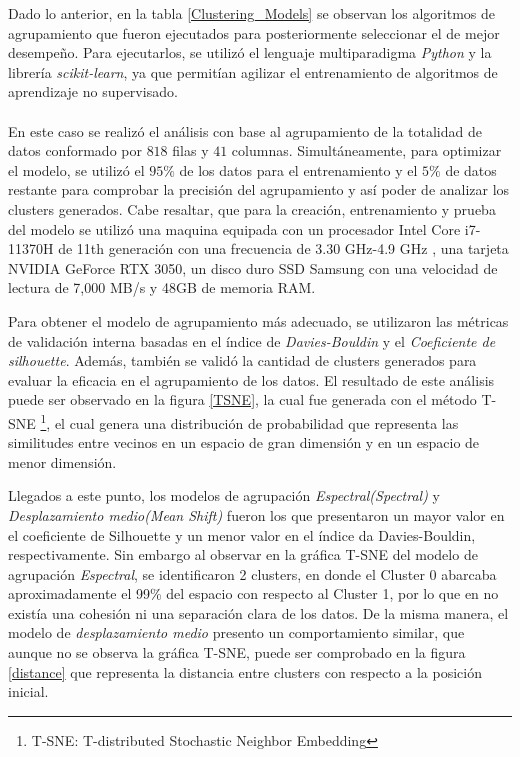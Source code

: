 Dado lo anterior, en la tabla \ref{Clustering_Models} se observan los algoritmos de agrupamiento que fueron ejecutados para posteriormente seleccionar el de mejor desempeño. Para ejecutarlos, se utilizó el lenguaje multiparadigma \textit{Python} y la librería \textit{scikit-learn}, ya que permitían agilizar el entrenamiento de algoritmos de aprendizaje no supervisado.
\\\\
En este caso se realizó el análisis con base al agrupamiento de la totalidad de datos conformado por $818$ filas y $41$ columnas. Simultáneamente, para optimizar el modelo, se utilizó el $95\%$ de los datos para el entrenamiento y el $5\%$ de datos restante para comprobar la precisión del agrupamiento y así poder de analizar los clusters generados. Cabe resaltar, que para la creación, entrenamiento y prueba del modelo se utilizó una maquina equipada con un procesador Intel Core i7-11370H de 11th generación con una frecuencia de 3.30 GHz-4.9 GHz , una tarjeta NVIDIA GeForce RTX 3050, un disco duro SSD Samsung con una velocidad de lectura de 7,000 MB/s y 48GB de memoria RAM. 

Para obtener el modelo de agrupamiento más adecuado, se utilizaron las métricas de validación interna basadas en el índice de \textit{Davies-Bouldin} y el \textit{Coeficiente de silhouette}. Además, también se validó la cantidad de clusters generados para evaluar la eficacia en el agrupamiento de los datos. El resultado de este análisis puede ser observado en la figura \ref{TSNE}, la cual fue generada con el método T-SNE \footnote{T-SNE: T-distributed Stochastic Neighbor Embedding}, el cual genera una distribución de probabilidad que representa las similitudes entre vecinos en un espacio de gran dimensión y en un espacio de menor dimensión. 

Llegados a este punto, los modelos de agrupación \textit{Espectral(Spectral)} y \textit{Desplazamiento medio(Mean Shift)}  fueron los que presentaron un mayor valor en el coeficiente de Silhouette y un menor valor en el índice da Davies-Bouldin, respectivamente. Sin embargo al observar en la gráfica T-SNE del modelo de agrupación \textit{Espectral}, se identificaron 2 clusters, en donde el Cluster 0 abarcaba aproximadamente el 99\% del espacio con respecto al Cluster 1, por lo que en no existía una cohesión ni una separación clara de los datos. De la misma manera, el modelo de \textit{desplazamiento medio} presento un comportamiento similar, que aunque no se observa la gráfica T-SNE, puede ser comprobado en la figura \ref{distance} que representa la distancia entre clusters con respecto a la posición inicial.

